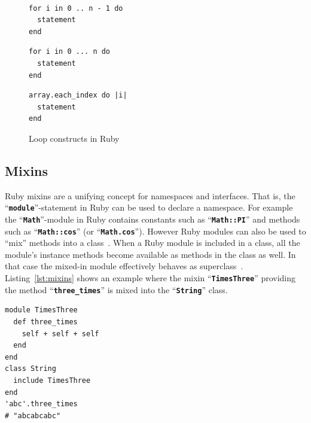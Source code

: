 \documentclass[12pt,a4paper,oneside,openright]{book}
\newcommand{\Eg}{For example }
\newcommand{\Ie}{That is, }
\newcommand{\lst}[1]{Listing~\ref{lst:#1}}
\newcommand{\code}[1]{``\texttt{\textbf{\textcolor{codegray}{\small{#1}}}}''}
\begin{document}
\begin{CJK}{UTF8}{}
\begin{figure}[htbp]
\begin{center}
\begin{minipage}[c]{.3\textwidth}
    \end{minipage}\\
    \begin{minipage}[c]{.3\textwidth}
      \begin{lstlisting}
for i in 0 .. n - 1 do
  statement
end
      \end{lstlisting}
    \end{minipage}\hspace{1ex}
    \begin{minipage}[c]{.3\textwidth}
      \begin{lstlisting}
for i in 0 ... n do
  statement
end
      \end{lstlisting}
    \end{minipage}\hspace{1ex}
    \begin{minipage}[c]{.3\textwidth}
      \begin{lstlisting}
array.each_index do |i|
  statement
end
      \end{lstlisting}
    \end{minipage}
  \end{center}
  \caption{Loop constructs in Ruby~\citep{RefWorks:541}\label{fig:loops}}
\end{figure}

\subsection{Mixins}
Ruby mixins are a unifying concept for namespaces and interfaces. \Ie the \code{module}-statement in Ruby can be used to declare a namespace. \Eg the \code{Math}-module in Ruby contains constants such as \code{Math::PI} and methods such as \code{Math::cos} (or \code{Math.cos}). However Ruby modules can also be used to ``mix'' methods into a class~\citep{RefWorks:541}. When a Ruby module is included in a class, all the module's instance methods become available as methods in the class as well. In that case the mixed-in module effectively behaves as superclass~\citep{thomas2004programming}. \lst{mixins} shows an example where the mixin \code{TimesThree} providing the method \code{three\_times} is mixed into the \code{String} class.
\lstset{language=Ruby,frame=single,numbers=none}
\begin{lstlisting}[float=htbp,caption={Mixins in Ruby},label=lst:mixins]
module TimesThree
  def three_times
    self + self + self
  end
end
class String
  include TimesThree
end
'abc'.three_times      
# "abcabcabc"
\end{lstlisting}


\end{CJK}
\end{document}
